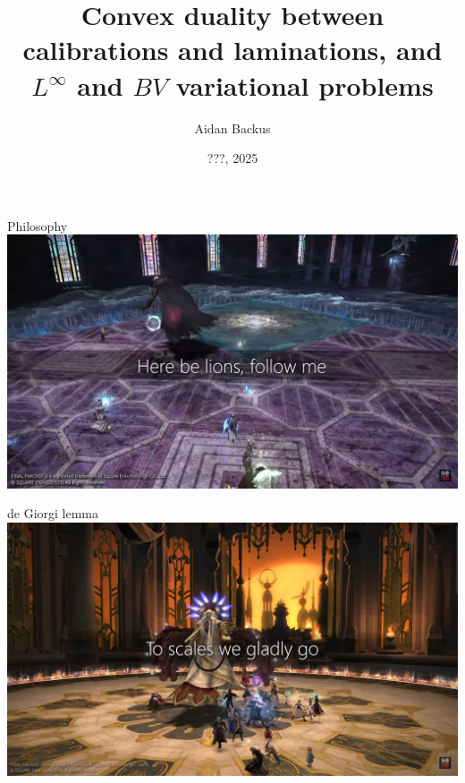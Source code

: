 \documentclass[10pt]{beamer}
\title{Convex duality between calibrations and laminations, and $L^\infty$ and $BV$ variational problems}
\date{???, 2025}
\author{Aidan Backus}
\institute{Brown University}
\begin{document}
\maketitle


\begin{frame}{Philosophy}
    \centering
    \includegraphics[width=\textwidth]{hic_svnt_leones}
\end{frame}

\begin{frame}{de Giorgi lemma}
    \centering
    \includegraphics[width=\textwidth]{to_scales}
\end{frame}
\end{document}
